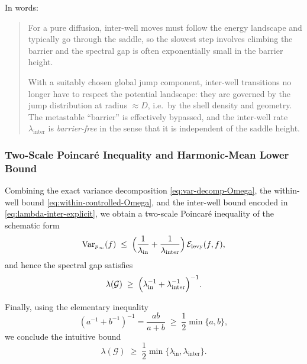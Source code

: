 In words:
\begin{quote}
For a pure diffusion, inter-well moves must follow the energy landscape and
typically go through the saddle, so the slowest step involves climbing the
barrier and the spectral gap is often exponentially small in the barrier height.

With a suitably chosen global jump component, inter-well transitions no longer
have to respect the potential landscape: they are governed by the jump
distribution at radius \(\approx D\), i.e.\ by the shell density and geometry.
The metastable “barrier” is effectively bypassed, and the inter-well rate
\(\lambda_{\mathrm{inter}}\) is \emph{barrier-free} in the sense that it is
independent of the saddle height.
\end{quote}

\subsubsection{Two-Scale Poincar\'e Inequality and Harmonic-Mean Lower Bound}\label{sec:two-scale-final}

Combining the exact variance decomposition \eqref{eq:var-decomp-Omega},
the within-well bound \eqref{eq:within-controlled-Omega},
and the inter-well bound encoded in \eqref{eq:lambda-inter-explicit},
we obtain a two-scale Poincar\'e inequality of the schematic form
\[
\mathrm{Var}_{p_\infty}(f)
\;\le\;
\Bigl(\frac{1}{\lambda_{\mathrm{in}}}+\frac{1}{\lambda_{\mathrm{inter}}}\Bigr)\,
\mathcal E_{\mathrm{levy}}(f,f),
\]
and hence the spectral gap satisfies
\begin{equation}\label{eq:hmean-gap}
\lambda(\mathcal G)
\;\ge\;
\Bigl(\lambda_{\mathrm{in}}^{-1}+\lambda_{\mathrm{inter}}^{-1}\Bigr)^{-1}.
\end{equation}

Finally, using the elementary inequality
\[
(a^{-1}+b^{-1})^{-1}
=
\frac{ab}{a+b}
\;\ge\;
\frac12\min\{a,b\},
\]
we conclude the intuitive bound
\begin{equation}\label{eq:min-gap}
\lambda(\mathcal G)
\;\ge\;
\frac12\min\{\lambda_{\mathrm{in}},\lambda_{\mathrm{inter}}\}.
\end{equation}


